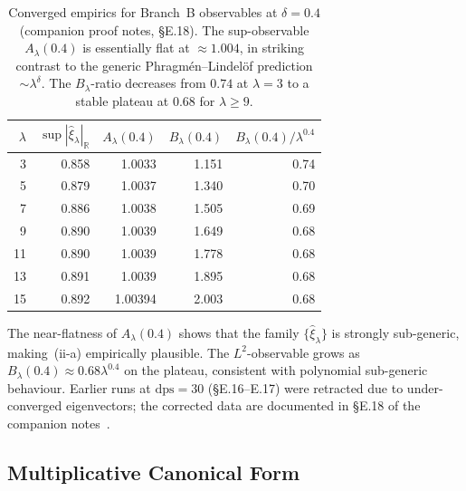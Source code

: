 \documentclass[12pt,a4paper]{article}
\theoremstyle{definition}
\theoremstyle{remark}
\begin{document}
\begin{table}[h]
\centering
\small
\begin{tabular}{r r r r r}
\toprule
$\lambda$ & $\sup|\hat\xi_\lambda|_{\mathbb R}$ & $A_\lambda(0.4)$ & $B_\lambda(0.4)$ & $B_\lambda(0.4)/\lambda^{0.4}$ \\
\midrule
 3 & 0.858 & 1.0033  & 1.151 & 0.74 \\
 5 & 0.879 & 1.0037  & 1.340 & 0.70 \\
 7 & 0.886 & 1.0038  & 1.505 & 0.69 \\
 9 & 0.890 & 1.0039  & 1.649 & 0.68 \\
11 & 0.890 & 1.0039  & 1.778 & 0.68 \\
13 & 0.891 & 1.0039  & 1.895 & 0.68 \\
15 & 0.892 & 1.00394 & 2.003 & 0.68 \\
\bottomrule
\end{tabular}
\caption{Converged empirics for Branch~B observables at $\delta = 0.4$
(companion proof notes, \S E.18). The sup-observable $A_\lambda(0.4)$ is
essentially flat at $\approx 1.004$, in striking contrast to the generic
Phragm\'en--Lindel\"of prediction $\sim \lambda^\delta$. The
$B_\lambda$-ratio decreases from $0.74$ at $\lambda=3$ to a stable
plateau at $0.68$ for $\lambda\ge 9$.}
\label{tab:route-b-empirics}
\end{table}

The near-flatness of $A_\lambda(0.4)$ shows that the family
$\{\hat\xi_\lambda\}$ is strongly sub-generic, making~(ii-a)
empirically plausible. The $L^2$-observable grows as
$B_\lambda(0.4)\approx 0.68\lambda^{0.4}$ on the plateau, consistent
with polynomial sub-generic behaviour. Earlier runs at $\mathrm{dps}=30$
(\S E.16--E.17) were retracted due to under-converged eigenvectors; the
corrected data are documented in \S E.18 of the companion
notes~\cite{Geiger2026evendom}.


\subsection{Multiplicative Canonical Form}
\label{sec:canonical-form}
\end{document}
